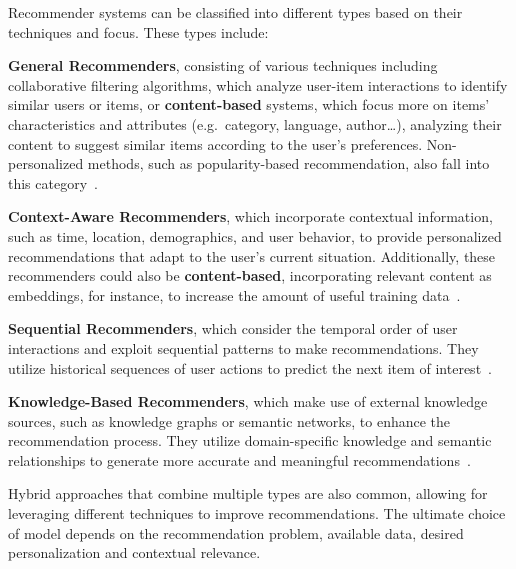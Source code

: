Recommender systems can be classified into different types based on their techniques and focus. These types include:
\begin{compactitem}[\textbullet]
    \item \textbf{General Recommenders}, consisting of various techniques including collaborative filtering algorithms, which analyze user-item interactions to identify similar users or items, or \textbf{content-based} systems, which focus more on items' characteristics and attributes (e.g.\ category, language, author\ldots), analyzing their content to suggest similar items according to the user's preferences. Non-personalized methods, such as popularity-based recommendation, also fall into this category~\cite{CHAPTER:RS-HANDBOOK-GENERAL}.
    \item \textbf{Context-Aware Recommenders}, which incorporate contextual information, such as time, location, demographics, and user behavior, to provide personalized recommendations that adapt to the user's current situation. Additionally, these recommenders could also be \textbf{content-based}, incorporating relevant content as embeddings, for instance, to increase the amount of useful training data~\cite{CHAPTER:RS-HANDBOOK-CONTEXT}.
    \item \textbf{Sequential Recommenders}, which consider the temporal order of user interactions and exploit sequential patterns to make recommendations. They utilize historical sequences of user actions to predict the next item of interest~\cite[Chapter 3.5]{CHAPTER:RS-HANDBOOK-MUSIC}.
    \item \textbf{Knowledge-Based Recommenders}, which make use of external knowledge sources, such as knowledge graphs or semantic networks, to enhance the recommendation process. They utilize domain-specific knowledge and semantic relationships to generate more accurate and meaningful recommendations~\cite{CHAPTER:RS-HANDBOOK-KNOWLEDGE}.
\end{compactitem}
Hybrid approaches that combine multiple types are also common, allowing for leveraging different techniques to improve recommendations. The ultimate choice of model depends on the recommendation problem, available data, desired personalization and contextual relevance.